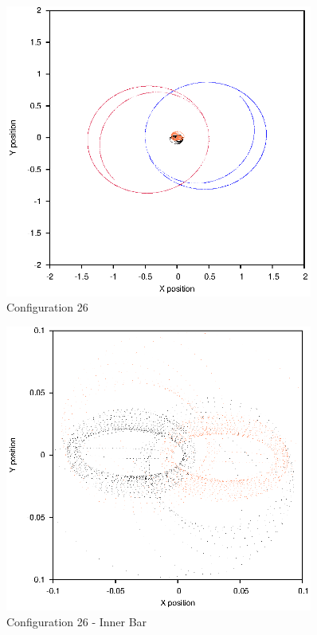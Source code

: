 \documentclass[a4paper,12pt]{article}
\begin{document}
\begin{figure}[H]
\centering
\includegraphics[width=0.9\textwidth]{./2017results/12-105-11-015/Orbit.eps}
\caption{Configuration 26}
\label{fig:config26}
\end{figure}
\begin{figure}[H]
\centering
\includegraphics[width=0.9\textwidth]{./2017results/12-105-11-015/Inner.eps}
\caption{Configuration 26 - Inner Bar}
\label{fig:config26i}
\end{figure}
\end{document}
